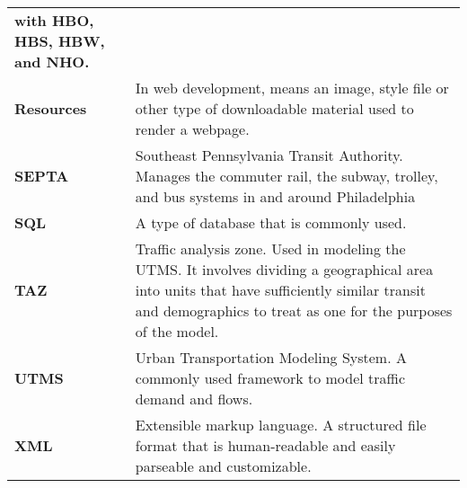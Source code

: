 {\begin{tabular}{%
    >{\raggedright\bfseries}p{}%
    p{\midcolumnwidth}}
  with HBO, HBS, HBW, and NHO. \\
  Resources & In web development, means an image, style file or other
  type of downloadable material used to render a webpage. \\
  SEPTA & Southeast Pennsylvania Transit Authority. Manages the
  commuter rail, the subway, trolley, and bus systems in and around
  Philadelphia \\
  SQL & A type of database that is commonly used. \\
  TAZ & Traffic analysis zone. Used in modeling the UTMS. It involves
  dividing a geographical area into units that have sufficiently
  similar transit and demographics to treat as one for the purposes of
  the model. \\
  UTMS & Urban Transportation Modeling System. A commonly used
  framework to model traffic demand and flows. \\
  XML & Extensible markup language. A structured file format that is
  human-readable and easily parseable and customizable. \\
\end{tabular}
}